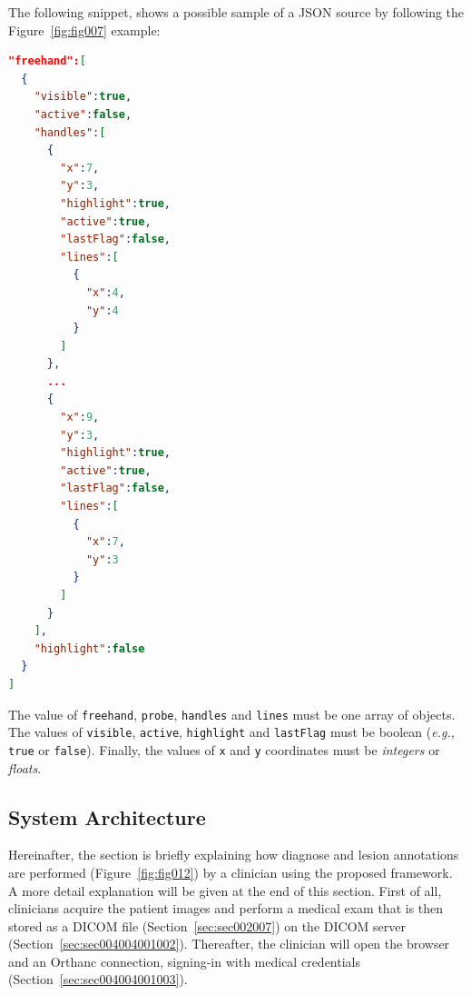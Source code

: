 \noindent
The following snippet, shows a possible sample of a \ac{JSON} source by following the Figure~\ref{fig:fig007} example:

\hfill

\begin{lstlisting}[language=json,firstnumber=1]
"freehand":[ 
  { 
    "visible":true,
    "active":false,
    "handles":[ 
      { 
        "x":7,
        "y":3,
        "highlight":true,
        "active":true,
        "lastFlag":false,
        "lines":[ 
          { 
            "x":4,
            "y":4
          }
        ]
      },
      ...
      { 
        "x":9,
        "y":3,
        "highlight":true,
        "active":true,
        "lastFlag":false,
        "lines":[ 
          { 
            "x":7,
            "y":3
          }
        ]
      }
    ],
    "highlight":false
  }
]
\end{lstlisting}

The value of \texttt{freehand}, \texttt{probe}, \texttt{handles} and \texttt{lines} must be one array of objects. The values of \texttt{visible}, \texttt{active}, \texttt{highlight} and \texttt{lastFlag} must be boolean ({\it e.g.}, \texttt{true} or \texttt{false}). Finally, the values of \texttt{x} and \texttt{y} coordinates must be {\it integers} or {\it floats}.

\subsection{System Architecture}
\label{sec:sec004004003}

Hereinafter, the section is briefly explaining how diagnose and lesion annotations are performed (Figure~\ref{fig:fig012}) by a clinician using the proposed framework.
A more detail explanation will be given at the end of this section.
First of all, clinicians acquire the patient images and perform a medical exam that is then stored as a \ac{DICOM} file (Section~\ref{sec:sec002007}) on the \ac{DICOM} server (Section~\ref{sec:sec004004001002}).
Thereafter, the clinician will open the browser and an Orthanc connection, signing-in with medical credentials (Section~\ref{sec:sec004004001003}).

